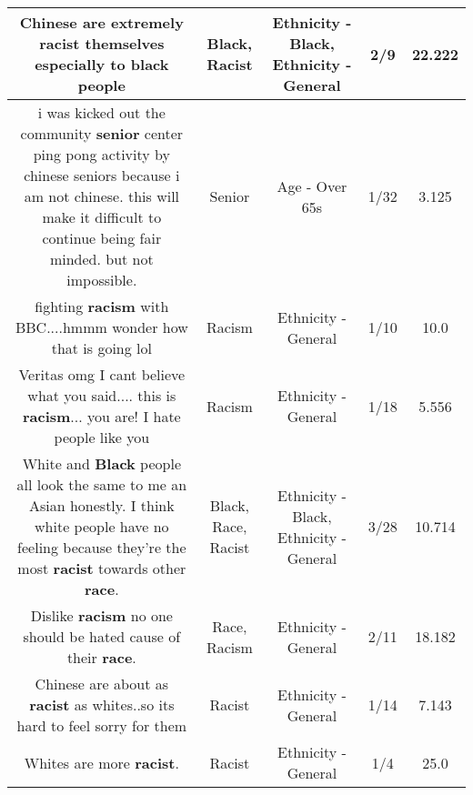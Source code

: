 \documentclass[11pt]{article}
\newlength\mylength
\begin{document}
\begin{center}
\begin{longtable}{|C{.65\mylength}|C{.30\mylength}|C{.12\mylength}|C{.12\mylength}|C{.12\mylength}|}
  \small Chinese are extremely \textbf{racist} themselves especially to \textbf{black} people\normalsize   & Black, Racist & Ethnicity - Black, Ethnicity - General & 2/9 & 22.222 \\  \hline
  \small i was kicked out the community \textbf{senior} center ping pong activity by chinese seniors because i am not chinese.  this will make it difficult to continue being fair minded.  but not impossible.\normalsize   & Senior & Age - Over 65s & 1/32 & 3.125 \\  \hline
  \small fighting \textbf{racism} with BBC....hmmm wonder how that is going lol\normalsize   & Racism & Ethnicity - General & 1/10 & 10.0 \\  \hline
  \small Veritas omg I cant believe what you said.... this is \textbf{racism}... you are! I hate people like you\normalsize   & Racism & Ethnicity - General & 1/18 & 5.556 \\  \hline
  \small White and \textbf{Black} people all look the same to me an Asian honestly. I think white people have no feeling because they're the most \textbf{racist} towards other \textbf{race}.\normalsize   & Black, Race, Racist & Ethnicity - Black, Ethnicity - General & 3/28 & 10.714 \\  \hline
  \small Dislike \textbf{racism}  no one should be hated cause of their \textbf{race}.\normalsize   & Race, Racism & Ethnicity - General & 2/11 & 18.182 \\  \hline
  \small Chinese are about as \textbf{racist} as whites..so its hard to  feel sorry for them\normalsize   & Racist & Ethnicity - General & 1/14 & 7.143 \\  \hline
  \small Whites are more \textbf{racist}.\normalsize   & Racist & Ethnicity - General & 1/4 & 25.0 \\  \hline

\end{longtable}
\end{center}
\end{document}
